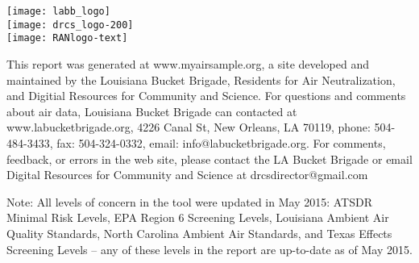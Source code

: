 \documentclass{article}
\newlength\acklength
\newlength\logowidth
\newcommand{\highlightbox}[1]{\colorbox{salmon}{\parbox{\linewidth}{#1}}}
\begin{document}
\newcommand{\standardssection}{
\section*{Sample screening levels}

\highlightbox{Some government agencies have developed standards and screening levels for
toxic chemicals in the air based on health information about the chemicals.
There is no information available for some toxic chemicals. The agencies are
listed below, with a brief description of the methods used in establishing their
levels. States may not be required to adhere to national standards.}

\begin{itemize}
\subst{standardblurbs}
\end{itemize}

}

     \vfill
     \parbox{\logowidth}{
       \texttt{[image: labb\_logo]}\\
       \vskip 0.1in
       \texttt{[image: drcs\_logo-200]}\\
       \vskip 0.1in
       \texttt{[image: RANlogo-text]}
     }
     \setlength\acklength{\textwidth}
     \addtolength\acklength{-\logowidth}
     \addtolength\acklength{-0.7in}
     \hskip 0.5in
     \parbox{\acklength}{
       \sloppy
       This report was generated at www.myairsample.org, a site
       \linebreak
       developed and maintained by the Louisiana Bucket Brigade,
       \linebreak
       Residents for Air Neutralization, and Digitial Resources for
       \linebreak
       Community and Science.  For questions and comments about air
       data, Louisiana Bucket Brigade can contacted at
       www.labucketbrigade.org, 4226 Canal St, New Orleans, LA 70119,
       phone: 504-484-3433, fax: 504-324-0332, email:
       info@labucketbrigade.org.  For comments, feedback, or errors in
       the web site, please contact the LA Bucket Brigade or email
       Digital Resources for Community and Science at
       drcsdirector@gmail.com
     }

\thispagestyle{empty}


\vspace*{0.15in}

Note: All levels of concern in the tool were updated in May 2015:
ATSDR Minimal Risk Levels, EPA Region 6 Screening Levels, Louisiana
Ambient Air Quality Standards, North Carolina Ambient Air Standards,
and Texas Effects Screening Levels -- any of these levels in the
report are up-to-date as of May 2015.

\end{document}

